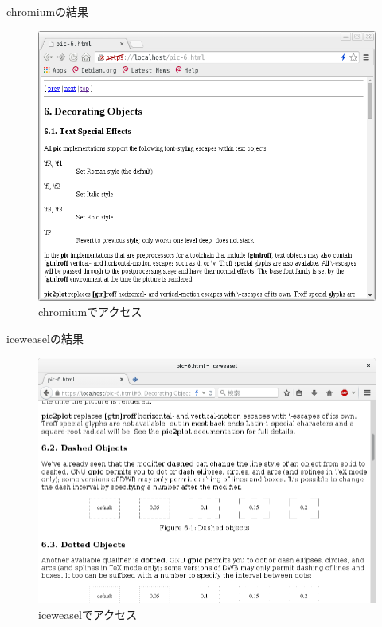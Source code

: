 \begin{frame}{chromiumの結果}

\begin{figure}[H]
\begin{center}
 \includegraphics[width=0.9\hsize]{image201507/chromium-groff-access.png}
\end{center}
\caption{chromiumでアクセス}
\end{figure}
 
\end{frame}

\begin{frame}{iceweaselの結果}

\begin{figure}[H]
\begin{center}
 \includegraphics[width=0.9\hsize]{image201507/iceweasel-groff-access.png}
\end{center}
\caption{iceweaselでアクセス}
\end{figure}
 
\end{frame}

